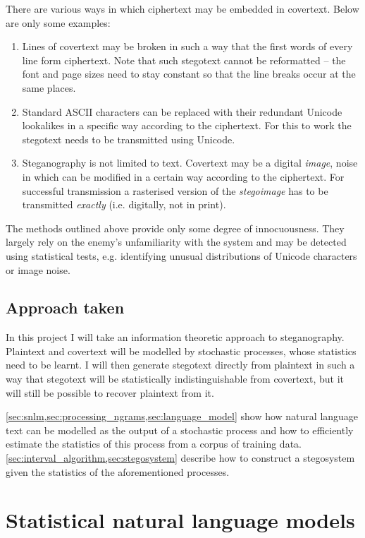 \documentclass[draft]{IIBproject}
\makeatletter
\DeclareRobustCommand*{\eg}{e.g.\@\xspace}
\DeclareRobustCommand*{\ie}{i.e.\@\xspace}
\makeatother
\begin{document}
There are various ways in which ciphertext may be embedded in covertext. Below are only some examples:

\begin{enumerate}
	\item Lines of covertext may be broken in such a way that the first words of every line form ciphertext. Note that such stegotext cannot be reformatted -- the font and page sizes need to stay constant so that the line breaks occur at the same places.
	\item Standard ASCII characters can be replaced with their redundant Unicode lookalikes in a specific way according to the ciphertext. For this to work the stegotext needs to be transmitted using Unicode.
	\item Steganography is not limited to text. Covertext may be a digital \emph{image}, noise in which can be modified in a certain way according to the ciphertext. For successful transmission a rasterised version of the \emph{stegoimage} has to be transmitted \emph{exactly} (\ie digitally, not in print).
\end{enumerate}

The methods outlined above provide only some degree of innocuousness. They largely rely on the enemy's unfamiliarity with the system and may be detected using statistical tests, \eg identifying unusual distributions of Unicode characters or image noise.

\subsection{Approach taken}

In this project I will take an information theoretic approach to steganography. Plaintext and covertext will be modelled by stochastic processes, whose statistics need to be learnt. I will then generate stegotext directly from plaintext in such a way that stegotext will be statistically indistinguishable from covertext, but it will still be possible to recover plaintext from it.

\cref{sec:snlm,sec:processing_ngrams,sec:language_model} show how natural language text can be modelled as the output of a stochastic process and how to efficiently estimate the statistics of this process from a corpus of training data. \cref{sec:interval_algorithm,sec:stegosystem} describe how to construct a stegosystem given the statistics of the aforementioned processes.

\cleardoublepage
\section{Statistical natural language models}
\label{sec:snlm}
\end{document}
